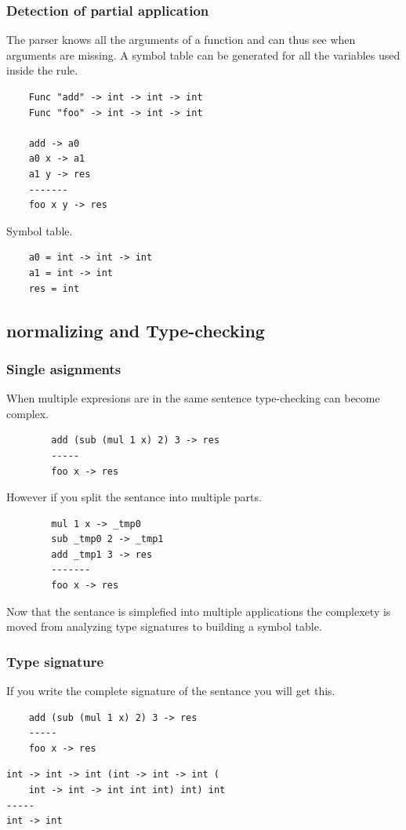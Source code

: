 \begin{frame}[fragile]
    \frametitle{Detection of partial application}   
    The parser knows all the arguments of a function and can thus see when arguments are missing.
    A symbol table can be generated for all the variables used inside the rule.

    \begin{lstlisting}
    Func "add" -> int -> int -> int
    Func "foo" -> int -> int -> int
    
    add -> a0
    a0 x -> a1
    a1 y -> res
    -------
    foo x y -> res
    \end{lstlisting}

    Symbol table.
    \begin{lstlisting}
    a0 = int -> int -> int
    a1 = int -> int
    res = int
    \end{lstlisting}
\end{frame}

\subsection{normalizing and Type-checking}


\begin{frame}[fragile]
    \frametitle{Single asignments}
    When multiple expresions are in the same sentence type-checking can become complex.
    \begin{lstlisting}
        add (sub (mul 1 x) 2) 3 -> res
        -----
        foo x -> res
    \end{lstlisting}
    However if you split the sentance into multiple parts.
    \begin{lstlisting}
        mul 1 x -> _tmp0
        sub _tmp0 2 -> _tmp1
        add _tmp1 3 -> res
        -------
        foo x -> res
    \end{lstlisting}
    Now that the sentance is simplefied into multiple applications the complexety is moved from analyzing type signatures to building a symbol table.
\end{frame}

\begin{frame}[fragile]
    \frametitle{Type signature}
    If you write the complete signature of the sentance you will get this.
    \begin{lstlisting}
    add (sub (mul 1 x) 2) 3 -> res
    -----
    foo x -> res
    \end{lstlisting}
    \begin{lstlisting}
int -> int -> int (int -> int -> int (
    int -> int -> int int int) int) int
-----
int -> int  
    \end{lstlisting}
\end{frame}

